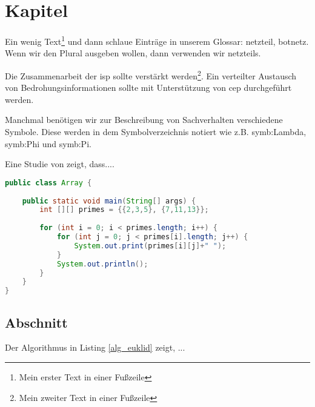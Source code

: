 \documentclass[twoside,12pt]{scrartcl}
\begin{document}
	\section{Kapitel}
\Blindtext

	
Ein wenig Text\footnote{Mein erster Text in einer Fußzeile} und dann schlaue Einträge in unserem Glossar: \gls{netzteil}, \gls{botnetz}. Wenn wir den Plural ausgeben wollen, dann verwenden wir \glspl{netzteil}.

Die Zusammenarbeit der \gls{isp} sollte verstärkt werden\footnote{Mein zweiter Text in einer Fußzeile}. Ein verteilter Austausch von Bedrohungsinformationen sollte mit Unterstützung von \gls{cep} durchgeführt werden.


Manchmal benötigen wir zur Beschreibung von Sachverhalten verschiedene Symbole. Diese werden in dem Symbolverzeichnis notiert wie z.B. \gls{symb:Lambda}, \gls{symb:Phi} und \gls{symb:Pi}. 
\vspace{0.5cm}

Eine Studie von \citet{Hofstede2014} zeigt, dass....

\begin{lstlisting}[language=Java, caption={Matrix},label=alg_euklid,style=eclipse-java,moreemph={[2]out}]
public class Array {
	
	public static void main(String[] args) {
		int [][] primes = {{2,3,5}, {7,11,13}};
		
		for (int i = 0; i < primes.length; i++) {
			for (int j = 0; j < primes[i].length; j++) {
				System.out.print(primes[i][j]+" ");
			}
			System.out.println();
		}
	}
}
\end{lstlisting}

\subsection{Abschnitt}

	\blindtext
	
	\vspace{1cm}
	Der Algorithmus in Listing \ref{alg_euklid} zeigt, ...
		\vspace{1cm}
	
\end{document}
